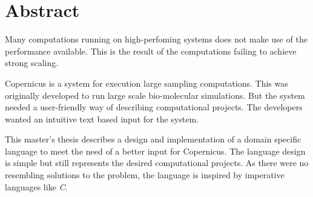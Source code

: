 \begingroup
\let\clearpage\relax
\let\cleardoublepage\relax
\let\cleardoublepage\relax

\chapter*{Abstract}

Many computations running on high-perfoming systems does not make use
of the performance available. This is the result of the computations
failing to achieve strong scaling.

Copernicus is a system for execution large sampling computations. This
was originally developed to run large scale bio-molecular
simulations. But the system needed a user-friendly way of describing
computational projects. The developers wanted an intuitive text based
input for the system.

This master's thesis describes a design and implementation of a domain
specific language to meet the need of a better input for
Copernicus. The language design is simple but still represents the
desired computational projects. As there were no resembling solutions
to the problem, the language is inspired by imperative languages
like \emph{C}.


\endgroup			

\vfill
